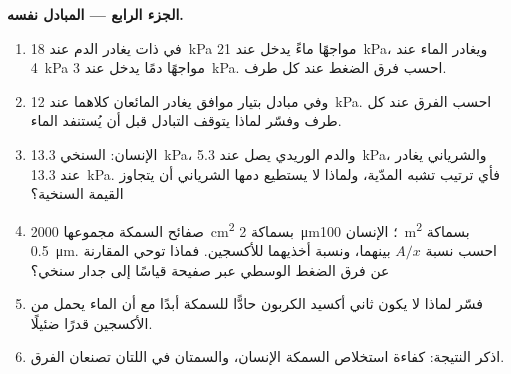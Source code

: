 \begin{problem}
\medskip
\noindent\textbf{الجزء الرابع --- المبادل نفسه.}
\begin{enumerate}[resume]
  \item في  ذات  يغادر الدم عند \qty{18}{kPa}
        مواجهًا ماءً يدخل عند \qty{21}{kPa}، ويغادر الماء عند
        \qty{4}{kPa} مواجهًا دمًا يدخل عند \qty{3}{kPa}. احسب
        فرق الضغط عند كل طرف.
  \item وفي مبادل بتيار موافق يغادر المائعان كلاهما عند
        \qty{12}{kPa}. احسب الفرق عند كل طرف وفسّر لماذا يتوقف
        التبادل قبل أن يُستنفد الماء.
  \item {} الإنسان: السنخي \qty{13.3}{kPa}، والدم الوريدي يصل عند
        \qty{5.3}{kPa}، والشرياني يغادر عند \qty{13.3}{kPa}.
        فأي ترتيب تشبه  المدّية، ولماذا لا يستطيع دمها
        الشرياني أن يتجاوز القيمة السنخية؟
  \item صفائح السمكة مجموعها \qty{2000}{cm^2} بسماكة
        \qty{2}{\micro m}؛  الإنسان \qty{100}{m^2} بسماكة
        \qty{0.5}{\micro m}. احسب نسبة $A/x$ بينهما، ونسبة أخذيهما
        للأكسجين. فماذا توحي المقارنة عن فرق الضغط الوسطي عبر صفيحة
        قياسًا إلى جدار سنخي؟
  \item فسّر لماذا لا يكون ثاني أكسيد الكربون حادًّا للسمكة أبدًا
        مع أن الماء يحمل من الأكسجين قدرًا ضئيلًا.
  \item اذكر النتيجة: كفاءة استخلاص  السمكة  الإنسان،
        والسمتان في  اللتان تصنعان الفرق.
\end{enumerate}
\end{problem}
